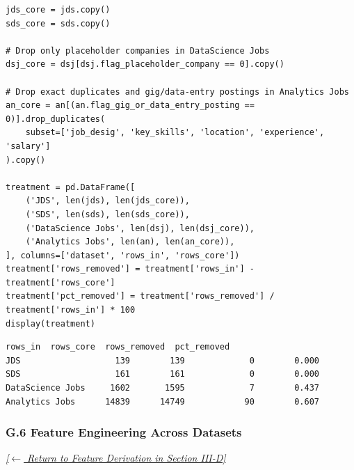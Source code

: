 \documentclass[conference]{IEEEtran}
\begin{document}
\begin{lstlisting}[style=pythonstyle,caption={Construction of core analysis frames without distorting source distributions.},label={lst:treatment_code}]
jds_core = jds.copy()
sds_core = sds.copy()

# Drop only placeholder companies in DataScience Jobs
dsj_core = dsj[dsj.flag_placeholder_company == 0].copy()

# Drop exact duplicates and gig/data-entry postings in Analytics Jobs
an_core = an[(an.flag_gig_or_data_entry_posting == 0)].drop_duplicates(
    subset=['job_desig', 'key_skills', 'location', 'experience', 'salary']
).copy()

treatment = pd.DataFrame([
    ('JDS', len(jds), len(jds_core)),
    ('SDS', len(sds), len(sds_core)),
    ('DataScience Jobs', len(dsj), len(dsj_core)),
    ('Analytics Jobs', len(an), len(an_core)),
], columns=['dataset', 'rows_in', 'rows_core'])
treatment['rows_removed'] = treatment['rows_in'] - treatment['rows_core']
treatment['pct_removed'] = treatment['rows_removed'] / treatment['rows_in'] * 100
display(treatment)
\end{lstlisting}

\begin{lstlisting}[style=outputstyle,caption={Execution Output G.5: Row-Drop Accounting Table.},label={out:treatment}]
rows_in  rows_core  rows_removed  pct_removed
JDS                   139        139             0        0.000
SDS                   161        161             0        0.000
DataScience Jobs     1602       1595             7        0.437
Analytics Jobs      14839      14749            90        0.607
\end{lstlisting}

\subsubsection*{G.6 Feature Engineering Across Datasets}
\label{lst:features}
\textit{\hyperref[sec:data_derivation]{[$\leftarrow$ Return to Feature Derivation in Section III-D]}}
\end{document}

